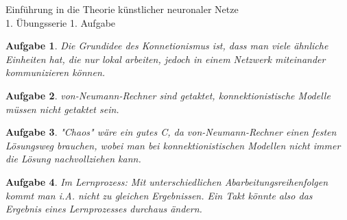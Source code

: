 \documentclass[11pt]{article}
\theoremstyle{break}
\newtheorem{task}{Aufgabe}
\def\hw{1}
\def\tasknumber{1}
\begin{document}
\begin{center}
\Large{Einführung in die Theorie künstlicher neuronaler Netze}\\
\large{\hw. Übungsserie}
\large{\tasknumber. Aufgabe}
\end{center}
\begin{task}
    Die Grundidee des Konnetionismus ist, dass man viele ähnliche Einheiten hat, die nur lokal arbeiten, jedoch in einem Netzwerk miteinander kommunizieren können.
\end{task}
\begin{task}
    von-Neumann-Rechner sind getaktet, konnektionistische Modelle müssen nicht getaktet sein.
\end{task}
\begin{task}
    "Chaos" wäre ein gutes C, da von-Neumann-Rechner einen festen Lösungsweg brauchen, wobei man bei konnektionistischen Modellen nicht immer die Lösung nachvollziehen kann.
\end{task}
\begin{task}
    Im Lernprozess: Mit unterschiedlichen Abarbeitungsreihenfolgen kommt man i.A. nicht zu gleichen Ergebnissen. Ein Takt könnte also das Ergebnis eines Lernprozesses durchaus ändern.
\end{task}
\end{document}
